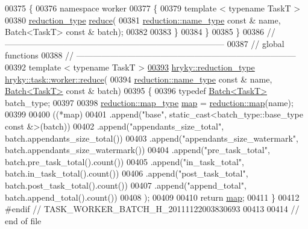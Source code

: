 \begin{DoxyCode}
00375 \{
00376 \textcolor{keyword}{namespace }worker
00377 \{
00379     \textcolor{keyword}{template} < \textcolor{keyword}{typename} TaskT >
00380     \hyperlink{classhryky_1_1_intrusive_ptr}{reduction_type} \hyperlink{namespacehryky_1_1task_1_1worker_a69f40c48f750e5d2a8b867f295119dac}{reduce}(
00381         \hyperlink{classhryky_1_1reduction_1_1_string}{reduction::name_type} \textcolor{keyword}{const} & name, Batch<TaskT> \textcolor{keyword}{const} & batch);
00382 
00383 \}
00384 \}
00385 \}
00386 \textcolor{comment}{//
      ------------------------------------------------------------------------------}
00387 \textcolor{comment}{// global functions}
00388 \textcolor{comment}{//
      ------------------------------------------------------------------------------}
00392 \textcolor{comment}{}\textcolor{keyword}{template} < \textcolor{keyword}{typename} TaskT >
\hypertarget{task__worker__batch_8h_source_l00393}{}\hyperlink{group__task_ga7bfbcc99f638cedafbdc6174770c4da1}{00393} \hyperlink{classhryky_1_1_intrusive_ptr}{hryky::reduction_type} \hyperlink{namespacehryky_1_1task_1_1worker_a69f40c48f750e5d2a8b867f295119dac}{hryky::task::worker::reduce}(
00394     \hyperlink{classhryky_1_1reduction_1_1_string}{reduction::name_type} \textcolor{keyword}{const} & name, \hyperlink{classhryky_1_1task_1_1worker_1_1_batch}{Batch<TaskT>} \textcolor{keyword}{const} & batch)
00395 \{
00396     \textcolor{keyword}{typedef} \hyperlink{classhryky_1_1task_1_1worker_1_1_batch}{Batch<TaskT>} batch\_type;
00397     
00398     \hyperlink{classhryky_1_1_intrusive_ptr}{reduction::map_type} \hyperlink{namespacehryky_1_1reduction_ac5eae270cf8047b294dc4ff3e5e11a79}{map} = \hyperlink{namespacehryky_1_1reduction_ac5eae270cf8047b294dc4ff3e5e11a79}{reduction::map}(name);
00399 
00400     ((*map)
00401      .append(\textcolor{stringliteral}{"base"},                        static\_cast<batch\_type::base\_type
       const &>(batch))
00402      .append(\textcolor{stringliteral}{"appendants\_size\_total"},       batch.appendants\_size\_total())
00403      .append(\textcolor{stringliteral}{"appendants\_size\_watermark"},   batch.appendants\_size\_watermark())
00404      .append(\textcolor{stringliteral}{"pre\_task\_total"},              batch.pre\_task\_total().count())
00405      .append(\textcolor{stringliteral}{"in\_task\_total"},               batch.in\_task\_total().count())
00406      .append(\textcolor{stringliteral}{"post\_task\_total"},             batch.post\_task\_total().count())
00407      .append(\textcolor{stringliteral}{"append\_total"},                batch.append\_total().count())
00408      );
00409     
00410     \textcolor{keywordflow}{return} \hyperlink{namespacehryky_1_1reduction_ac5eae270cf8047b294dc4ff3e5e11a79}{map};
00411 \}
00412 \textcolor{preprocessor}{#endif // TASK\_WORKER\_BATCH\_H\_20111122003830693}
00413 \textcolor{preprocessor}{}
00414 \textcolor{comment}{// end of file}
\end{DoxyCode}
